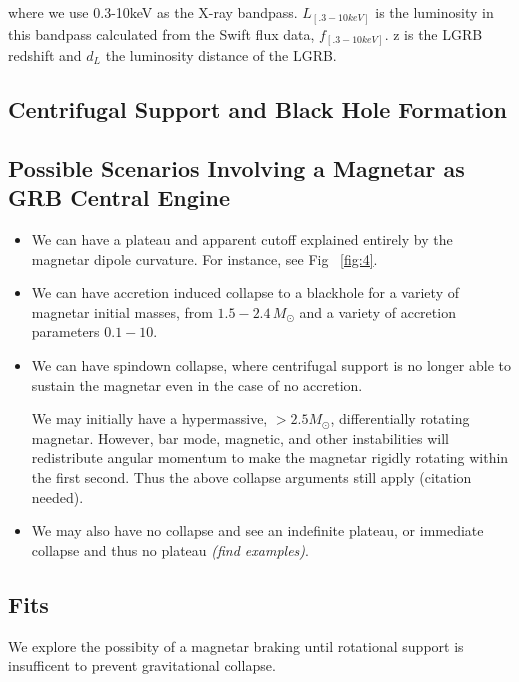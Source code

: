 \documentclass{article}
\begin{document}
where we use 0.3-10keV as the X-ray bandpass.  $L_{[.3-10 keV]}$ is the luminosity in this bandpass calculated from the Swift flux data,  $f_{[.3-10 keV]}$. z is the LGRB redshift and $d_L$ the luminosity distance of the LGRB.

\subsection{Centrifugal Support and Black Hole Formation}

\subsection{Possible Scenarios Involving a Magnetar as GRB Central Engine}

\begin{itemize}
\item We can have a plateau and apparent cutoff explained entirely by the magnetar dipole curvature. For instance, see Fig  ~\ref{fig:4}. \newline

\item We can have accretion induced collapse to a blackhole for a variety of magnetar initial masses, from $1.5-2.4\, M_{\odot}$ and a variety of accretion parameters $0.1-10$. \newline

\item We can have spindown collapse, where centrifugal support is no longer able to sustain the magnetar even in the case of no accretion. \newline 

We may initially have a hypermassive, $>2.5 M_{\odot}$,  differentially rotating magnetar. However, bar mode, magnetic, and other instabilities will redistribute angular momentum to make the magnetar rigidly rotating within the first second. Thus the above collapse arguments still apply (citation needed). \newline

\item We may also  have no collapse and see an indefinite plateau, or immediate collapse and thus no plateau \textit{(find examples)}.

\end{itemize}
\subsection{Fits}

We explore the possibity of a magnetar braking until rotational support is insufficent to prevent gravitational collapse.
\end{document}
